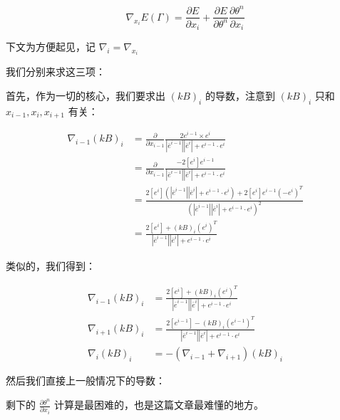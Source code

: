 \documentclass{notes}
\begin{document}
\begin{equation}
	\nabla_{x_i} E(\Gamma) = \frac{\partial E}{\partial x_i} + \frac{\partial E}{\partial \theta^n} \frac{\partial \theta^n}{\partial x_i}
\end{equation}

\begin{notation}
	下文为方便起见，记 $\nabla_i = \nabla_{x_i}$
\end{notation}

我们分别来求这三项：

首先，作为一切的核心，我们要求出 $(kB)_i$ 的导数，注意到 $(kB)_i$ 只和 $x_{i - 1}, x_i, x_{i + 1}$ 有关：

$$
	\begin{aligned}
	\nabla_{i - 1} (kB)_i &= \frac{\partial }{\partial x_{i - 1}} \frac{2 e^{i - 1} \times e^i}{\left|\bar{e}^{i - 1}\right| \left|\bar{e}^{i}\right| + e^{i - 1} \cdot e^i} \\
	&= \frac{\partial }{\partial x_{i - 1}} \frac{-2[e^i]e^{i - 1}}{\left|\bar{e}^{i - 1}\right| \left|\bar{e}^{i}\right| + e^{i - 1} \cdot e^i} \\
	&= \frac{2[e^i](\left|\bar{e}^{i - 1}\right| \left|\bar{e}^{i}\right| + e^{i - 1} \cdot e^i) + 2[e^i]e^{i - 1}(-e^i)^T}{(\left|\bar{e}^{i - 1}\right| \left|\bar{e}^{i}\right| + e^{i - 1} \cdot e^i)^2} \\
	&= \frac{2[e^i] + (kB)_i(e^i)^T}{\left|\bar{e}^{i - 1}\right| \left|\bar{e}^{i}\right| + e^{i - 1} \cdot e^i} 
	\end{aligned}
$$

类似的，我们得到：

\begin{equation}
	\begin{aligned}
		\nabla_{i - 1} (kB)_i &= \frac{2[e^i] + (kB)_i(e^i)^T}{\left|\bar{e}^{i - 1}\right| \left|\bar{e}^{i}\right| + e^{i - 1} \cdot e^i} \\
		\nabla_{i + 1} (kB)_i &= \frac{2[e^{i - 1}] - (kB)_i(e^{i - 1})^T}{\left|\bar{e}^{i - 1}\right| \left|\bar{e}^{i}\right| + e^{i - 1} \cdot e^i} \\
		\nabla_{i} (kB)_i &= -(\nabla_{i - 1} + \nabla_{i + 1}) (kB)_i
	\end{aligned}
\end{equation}

然后我们直接上一般情况下的导数：


剩下的 $\frac{\partial \theta^n}{\partial x_i}$ 计算是最困难的，也是这篇文章最难懂的地方。
\end{document}
